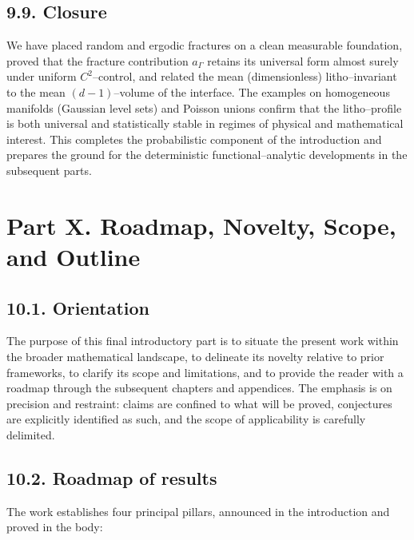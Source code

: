 \subsection*{9.9. Closure}
We have placed random and ergodic fractures on a clean measurable foundation, proved that the fracture contribution $a_\Gamma$ retains its universal form almost surely under uniform $C^2$–control, and related the mean (dimensionless) litho–invariant to the mean $(d-1)$–volume of the interface. The examples on homogeneous manifolds (Gaussian level sets) and Poisson unions confirm that the litho–profile is both universal and statistically stable in regimes of physical and mathematical interest. This completes the probabilistic component of the introduction and prepares the ground for the deterministic functional–analytic developments in the subsequent parts.

\section*{Part X. Roadmap, Novelty, Scope, and Outline}

\subsection*{10.1. Orientation}
The purpose of this final introductory part is to situate the present work within the broader mathematical landscape, to delineate its novelty relative to prior frameworks, to clarify its scope and limitations, and to provide the reader with a roadmap through the subsequent chapters and appendices. The emphasis is on precision and restraint: claims are confined to what will be proved, conjectures are explicitly identified as such, and the scope of applicability is carefully delimited.

\subsection*{10.2. Roadmap of results}
The work establishes four principal pillars, announced in the introduction and proved in the body:


